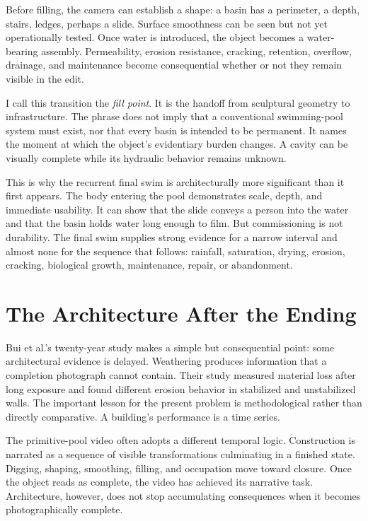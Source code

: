\documentclass[11pt]{article}
\begin{document}
Before filling, the camera can establish a shape: a basin has a perimeter, a depth, stairs, ledges, perhaps a slide. Surface smoothness can be seen but not yet operationally tested. Once water is introduced, the object becomes a water-bearing assembly. Permeability, erosion resistance, cracking, retention, overflow, drainage, and maintenance become consequential whether or not they remain visible in the edit.

I call this transition the \emph{fill point}. It is the handoff from sculptural geometry to infrastructure. The phrase does not imply that a conventional swimming-pool system must exist, nor that every basin is intended to be permanent. It names the moment at which the object's evidentiary burden changes. A cavity can be visually complete while its hydraulic behavior remains unknown.

This is why the recurrent final swim is architecturally more significant than it first appears. The body entering the pool demonstrates scale, depth, and immediate usability. It can show that the slide conveys a person into the water and that the basin holds water long enough to film. But commissioning is not durability. The final swim supplies strong evidence for a narrow interval and almost none for the sequence that follows: rainfall, saturation, drying, erosion, cracking, biological growth, maintenance, repair, or abandonment.

\section{The Architecture After the Ending}

Bui et al.'s twenty-year study makes a simple but consequential point: some architectural evidence is delayed. Weathering produces information that a completion photograph cannot contain. Their study measured material loss after long exposure and found different erosion behavior in stabilized and unstabilized walls. The important lesson for the present problem is methodological rather than directly comparative. A building's performance is a time series.

The primitive-pool video often adopts a different temporal logic. Construction is narrated as a sequence of visible transformations culminating in a finished state. Digging, shaping, smoothing, filling, and occupation move toward closure. Once the object reads as complete, the video has achieved its narrative task. Architecture, however, does not stop accumulating consequences when it becomes photographically complete.
\end{document}
